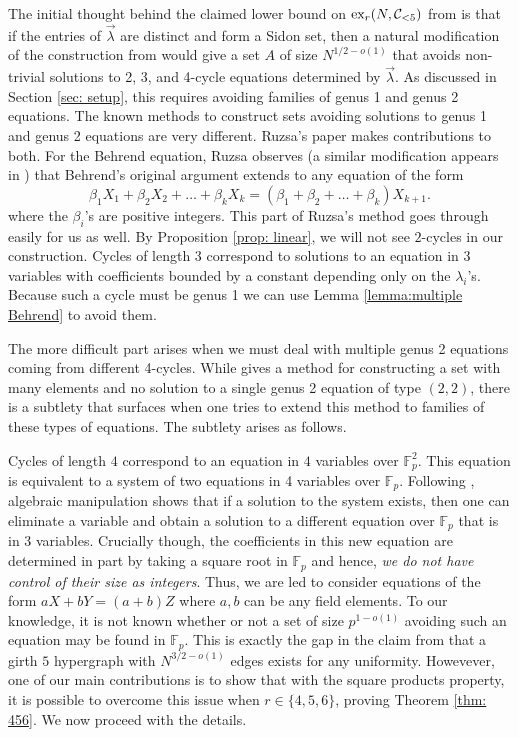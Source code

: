 \documentclass[12pt]{article}%
\begin{document}
The initial thought behind the claimed lower bound on 
$\textup{ex}_r ( N , \mathcal{C}_{< 5} )$ from \cite{TV} is that if the entries of $\vec{ \lambda}$ are distinct
and form a Sidon set, then a natural modification of the construction from \cite{Ruzsa} would give a set $A$ of size $N^{1/2 - o(1)}$ that avoids non-trivial solutions to 2, 3, and 4-cycle equations determined by $\vec{\lambda}$. 
 As discussed in Section \ref{sec: setup}, this requires avoiding families of genus 1 and genus 2 equations.  The known methods to construct sets avoiding solutions to genus 1 and genus 2 equations are very different.  Ruzsa's paper \cite{Ruzsa} makes contributions to both. For the Behrend equation, Ruzsa observes (a similar modification appears in \cite{alon}) that Behrend's original argument extends to any equation of the form 
\[
\beta_1 X_1 + \beta_2 X_2 + \dots + \beta_k X_k = 
(\beta_1 + \beta_2 + \dots + \beta_k)X_{k+1}.
\]
where the $\beta_i$'s are positive integers. This part of Ruzsa's method goes through easily for us as well.
By Proposition \ref{prop: linear}, we will not see $2$-cycles in our construction. Cycles of length $3$ correspond to solutions to an equation in $3$ variables with coefficients bounded by a constant depending only on the $\lambda_i$'s.  Because such a cycle must be genus 1 we can use Lemma \ref{lemma:multiple Behrend} to avoid them. 

The more difficult part arises when we must deal with 
multiple genus 2 equations coming from different 4-cycles.  
 While \cite{Ruzsa} gives a method for constructing a set with 
 many elements and no solution to a single genus 2 equation of type $(2,2)$, 
 there is a subtlety that surfaces when one tries to extend this method 
 to families of these types of equations. The subtlety arises as follows.

Cycles of length $4$ correspond to an equation in $4$ variables over $\mathbb{F}_p^2$.  This equation is equivalent to a system of two equations in 4 variables 
over $\mathbb{F}_p$. Following \cite{Ruzsa}, algebraic manipulation shows that if a solution to the system exists, then one can eliminate a variable and obtain 
a solution to a different equation over $\mathbb{F}_p$ that is in 3 variables.   
Crucially though, the coefficients in this new equation are determined in part by taking a square root in $\mathbb{F}_p$ and hence, {\em we do not have control of their size as integers}.  {Thus, we are led to consider equations} of the form $aX + bY = (a+b)Z$ where $a,b$ can be any field elements. To our knowledge, it is not known whether or not a set of size $p^{1-o(1)}$ avoiding such an equation may be found in $\mathbb{F}_p$.  This is exactly the gap in the claim from \cite{TV} that a girth $5$ hypergraph with $N^{3/2-o(1)}$ edges exists for any uniformity. 
Howevever, one of our main contributions is to show that with the square products property, it is possible to overcome this issue when $r\in \{4,5,6\}$, proving Theorem \ref{thm: 456}.  We now proceed with the details.
\end{document}
